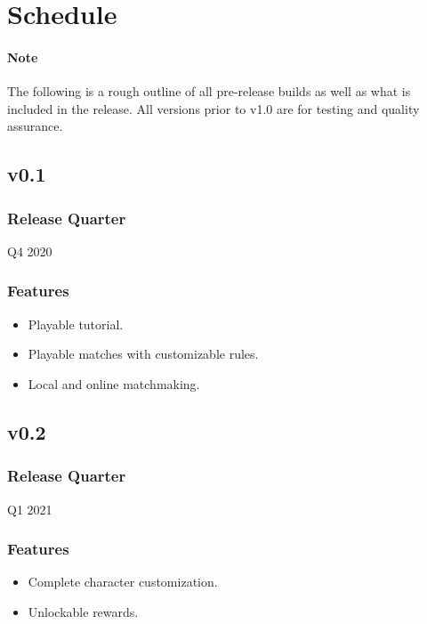 \section{Schedule}

\paragraph{Note} The following is a rough outline of all pre-release builds as well as what is included in the release. All versions prior to v1.0 are for testing and quality assurance.

\subsection{v0.1}

\subsubsection{Release Quarter}

Q4 2020

\subsubsection{Features}

\begin{itemize}
    \item Playable tutorial.
    \item Playable matches with customizable rules.
    \item Local and online matchmaking.
\end{itemize}

\subsection{v0.2}

\subsubsection{Release Quarter}

Q1 2021

\subsubsection{Features}

\begin{itemize}
    \item Complete character customization.
    \item Unlockable rewards.
\end{itemize}

